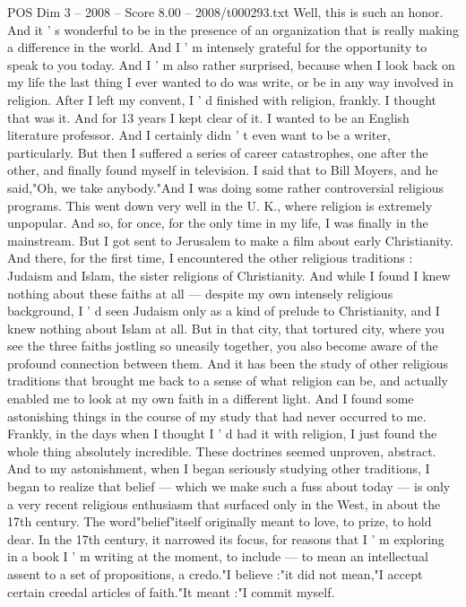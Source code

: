 \begin{textsample}{POS Dim 3 – 2008 – Score 8.00 – 2008/t000293.txt}  \label{ex:f3_pos_064}
Well, this is such an honor.
And it ' s wonderful to be in the presence of an organization that is really making a difference in the world.
And I ' m intensely grateful for the opportunity to speak to you today.
And I ' m also rather surprised, because when I look back on my life the last thing I ever wanted to do was write, or be in any way involved in religion.
After I left my convent, I ' d finished with religion, frankly.
I thought that was it.
And for 13 years I kept clear of it.
I wanted to be an English literature professor.
And I certainly didn ' t even want to be a writer, particularly.
But then I suffered a series of career catastrophes, one after the other, and finally found myself in television.
I said that to Bill Moyers, and he said,"Oh, we take anybody."And I was doing some rather controversial religious programs.
This went down very well in the U.
K., where religion is extremely unpopular.
And so, for once, for the only time in my life, I was finally in the mainstream.
But I got sent to Jerusalem to make a film about early Christianity.
And there, for the first time, I encountered the other religious traditions : Judaism and Islam, the sister religions of Christianity.
And while I found I knew nothing about these faiths at all — despite my own intensely religious background, I ' d seen Judaism only as a kind of prelude to Christianity, and I knew nothing about Islam at all.
But in that city, that tortured city, where you see the three faiths jostling so uneasily together, you also become aware of the profound connection between them.
And it has been the study of other religious traditions that brought me back to a sense of what religion can be, and actually enabled me to look at my own faith in a different light.
And I found some astonishing things in the course of my study that had never occurred to me.
Frankly, in the days when I thought I ' d had it with religion, I just found the whole thing absolutely incredible.
These doctrines seemed unproven, abstract.
And to my astonishment, when I began seriously studying other traditions, I began to realize that belief — which we make such a fuss about today — is only a very recent religious enthusiasm that surfaced only in the West, in about the 17th century.
The word"belief"itself originally meant to love, to prize, to hold dear.
In the 17th century, it narrowed its focus, for reasons that I ' m exploring in a book I ' m writing at the moment, to include — to mean an intellectual assent to a set of propositions, a credo."I believe :"it did not mean,"I accept certain creedal articles of faith."It meant :"I commit myself.

\end{textsample}
